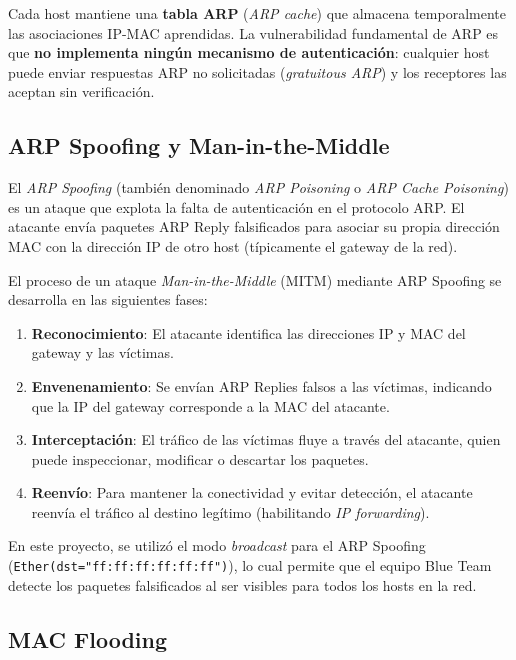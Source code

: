 \documentclass[12pt, a4paper]{article}
\begin{document}
Cada host mantiene una \textbf{tabla ARP} (\textit{ARP cache}) que almacena temporalmente las asociaciones IP-MAC aprendidas. La vulnerabilidad fundamental de ARP es que \textbf{no implementa ning\'un mecanismo de autenticaci\'on}: cualquier host puede enviar respuestas ARP no solicitadas (\textit{gratuitous ARP}) y los receptores las aceptan sin verificaci\'on.

\subsection{ARP Spoofing y Man-in-the-Middle}

El \textit{ARP Spoofing} (tambi\'en denominado \textit{ARP Poisoning} o \textit{ARP Cache Poisoning}) es un ataque que explota la falta de autenticaci\'on en el protocolo ARP. El atacante env\'ia paquetes ARP Reply falsificados para asociar su propia direcci\'on MAC con la direcci\'on IP de otro host (t\'ipicamente el gateway de la red).

El proceso de un ataque \textit{Man-in-the-Middle} (MITM) mediante ARP Spoofing se desarrolla en las siguientes fases:

\begin{enumerate}[leftmargin=2cm]
    \item \textbf{Reconocimiento}: El atacante identifica las direcciones IP y MAC del gateway y las v\'ictimas.
    \item \textbf{Envenenamiento}: Se env\'ian ARP Replies falsos a las v\'ictimas, indicando que la IP del gateway corresponde a la MAC del atacante.
    \item \textbf{Interceptaci\'on}: El tr\'afico de las v\'ictimas fluye a trav\'es del atacante, quien puede inspeccionar, modificar o descartar los paquetes.
    \item \textbf{Reenv\'io}: Para mantener la conectividad y evitar detecci\'on, el atacante reenv\'ia el tr\'afico al destino leg\'itimo (habilitando \textit{IP forwarding}).
\end{enumerate}

\begin{alertbox}
En este proyecto, se utiliz\'o el modo \textit{broadcast} para el ARP Spoofing (\texttt{Ether(dst="ff:ff:ff:ff:ff:ff")}), lo cual permite que el equipo Blue Team detecte los paquetes falsificados al ser visibles para todos los hosts en la red.
\end{alertbox}

\subsection{MAC Flooding}
\end{document}
